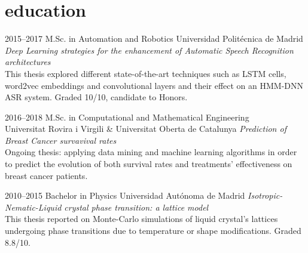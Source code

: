 \documentclass[]{friggeri-cv-a4}
\begin{document}

\section{education}

\begin{entrylist}


\entry
{2015--2017}
{M.Sc. {\normalfont in Automation and Robotics}}
{Universidad Politécnica de Madrid}
{\small{\emph{Deep Learning strategies for the enhancement of Automatic Speech Recognition architectures} }\\ This thesis explored different state-of-the-art techniques such as LSTM cells, word2vec embeddings and convolutional layers and their effect on an HMM-DNN ASR system. Graded 10/10, candidate to Honors.}


\entry
{2016--2018}
{M.Sc. {\normalfont in Computational and Mathematical Engineering}}
{\\Universitat Rovira i Virgili \& Universitat Oberta de Catalunya}
{\small{\emph{Prediction of Breast Cancer survavival rates}} \\ Ongoing thesis: applying data mining and machine learning algorithms in order to predict the evolution of both survival rates and treatments' effectiveness on breast cancer patients.}


\entry
{2010--2015}
{Bachelor {\normalfont in Physics}}
{Universidad Autónoma de Madrid}
{\small{\emph{Isotropic-Nematic-Liquid crystal phase transition: a lattice model}} \\ This thesis reported on Monte-Carlo simulations of liquid crystal's lattices undergoing phase transitions due to temperature or shape modifications. Graded 8.8/10.}


\end{entrylist}

\end{document}
